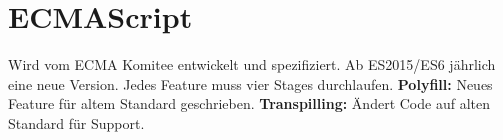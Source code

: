 \section{ECMAScript}
Wird vom ECMA Komitee entwickelt und spezifiziert. Ab ES2015/ES6 jährlich eine neue Version. Jedes Feature muss vier Stages durchlaufen. \textbf{Polyfill:} Neues Feature für altem Standard geschrieben. \textbf{Transpilling:} Ändert Code auf alten Standard für Support. 